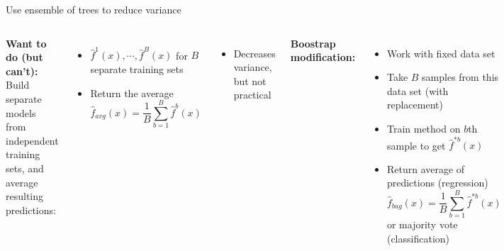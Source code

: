 \documentclass[aspectratio=169,usenames,dvipsnames]{beamer}
\newcommand{\InstructorList}[1]{
\begin{itemize}
	\color{orange}
	#1
\end{itemize}
}
\begin{document}
\begin{frame}[t]{Use ensemble of trees to reduce variance}

\begin{columns}

\textbf{Want to do (but can't):} \\
Build separate models from independent training sets, and average resulting predictions:
\begin{itemize}
	\item $\hat f^1(x), \cdots, \hat f^B(x)$ for $B$ separate training sets
	\item Return the average
	\begin{equation*}
		\hat f_{avg}(x) = \frac{1}{B} \sum_{b=1}^B \hat f^b(x)
	\end{equation*}

\end{itemize}
\InstructorList{
  \item Decreases variance, but not practical
}


\textbf{Boostrap modification:}
\begin{itemize}
	\item Work with fixed data set
	\item Take $B$ samples from this data set (with replacement)
	\item Train method on $b$th sample to get $\hat f^{*b}(x)$
	\item Return average of predictions (regression)
	\begin{equation*}
		\hat f_{bag}(x) = \frac{1}{B} \sum_{b=1}^B \hat f^{*b}(x)
	\end{equation*}
	or majority vote (classification)
\end{itemize}



\end{columns}

\end{frame}
\end{document}
